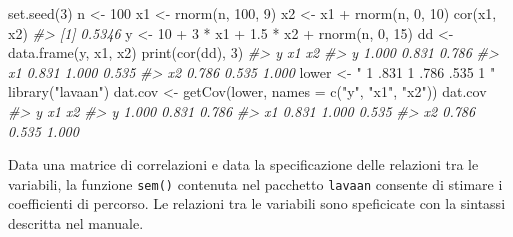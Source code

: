 \documentclass[
  11pt,
]{krantz}
\makeatletter
\newenvironment{Shaded}{\begin{snugshade}}{\end{snugshade}}
\newcommand{\AttributeTok}[1]{\textcolor[rgb]{0.61,0.61,0.61}{#1}}
\newcommand{\CommentTok}[1]{\textcolor[rgb]{0.37,0.37,0.37}{\textit{#1}}}
\newcommand{\DecValTok}[1]{\textcolor[rgb]{0.06,0.06,0.06}{#1}}
\newcommand{\FloatTok}[1]{\textcolor[rgb]{0.06,0.06,0.06}{#1}}
\newcommand{\FunctionTok}[1]{\textcolor[rgb]{0,0,0}{#1}}
\newcommand{\NormalTok}[1]{#1}
\newcommand{\OtherTok}[1]{\textcolor[rgb]{0.37,0.37,0.37}{#1}}
\newcommand{\SpecialCharTok}[1]{\textcolor[rgb]{0,0,0}{#1}}
\newcommand{\StringTok}[1]{\textcolor[rgb]{0.5,0.5,0.5}{#1}}
\newenvironment{kframe}{%
\medskip{}
\setlength{\fboxsep}{.8em}
 \def\at@end@of@kframe{}%
 \ifinner\ifhmode%
  \def\at@end@of@kframe{\end{minipage}}%
  \begin{minipage}{\columnwidth}%
 \fi\fi%
 \def\FrameCommand##1{\hskip\@totalleftmargin \hskip-\fboxsep
 \colorbox{shadecolor}{##1}\hskip-\fboxsep
     \hskip-\linewidth \hskip-\@totalleftmargin \hskip\columnwidth}%
 \MakeFramed {\advance\hsize-\width
   \@totalleftmargin\z@ \linewidth\hsize
   \@setminipage}}%
 {\par\unskip\endMakeFramed%
 \at@end@of@kframe}
\renewenvironment{Shaded}{\begin{kframe}}{\end{kframe}}
\theoremstyle{definition}
\theoremstyle{definition}
\theoremstyle{definition}
\theoremstyle{definition}
\theoremstyle{remark}
\makeatother
\begin{document}
\begin{Shaded}
\begin{Highlighting}[]
\FunctionTok{set.seed}\NormalTok{(}\DecValTok{3}\NormalTok{)}
\NormalTok{n }\OtherTok{\textless{}{-}} \DecValTok{100}
\NormalTok{x1 }\OtherTok{\textless{}{-}} \FunctionTok{rnorm}\NormalTok{(n, }\DecValTok{100}\NormalTok{, }\DecValTok{9}\NormalTok{)}
\NormalTok{x2 }\OtherTok{\textless{}{-}}\NormalTok{ x1 }\SpecialCharTok{+} \FunctionTok{rnorm}\NormalTok{(n, }\DecValTok{0}\NormalTok{, }\DecValTok{10}\NormalTok{)}
\FunctionTok{cor}\NormalTok{(x1, x2)}
\CommentTok{\#\textgreater{} [1] 0.5346}
\NormalTok{y }\OtherTok{\textless{}{-}} \DecValTok{10} \SpecialCharTok{+} \DecValTok{3} \SpecialCharTok{*}\NormalTok{ x1 }\SpecialCharTok{+} \FloatTok{1.5} \SpecialCharTok{*}\NormalTok{ x2 }\SpecialCharTok{+} \FunctionTok{rnorm}\NormalTok{(n, }\DecValTok{0}\NormalTok{, }\DecValTok{15}\NormalTok{)}
\NormalTok{dd }\OtherTok{\textless{}{-}} \FunctionTok{data.frame}\NormalTok{(y, x1, x2)}
\FunctionTok{print}\NormalTok{(}\FunctionTok{cor}\NormalTok{(dd), }\DecValTok{3}\NormalTok{)}
\CommentTok{\#\textgreater{}        y    x1    x2}
\CommentTok{\#\textgreater{} y  1.000 0.831 0.786}
\CommentTok{\#\textgreater{} x1 0.831 1.000 0.535}
\CommentTok{\#\textgreater{} x2 0.786 0.535 1.000}
\NormalTok{lower }\OtherTok{\textless{}{-}} \StringTok{"}
\StringTok{ 1}
\StringTok{ .831 1}
\StringTok{ .786 .535 1}
\StringTok{"}
\FunctionTok{library}\NormalTok{(}\StringTok{"lavaan"}\NormalTok{)}
\NormalTok{dat.cov }\OtherTok{\textless{}{-}} \FunctionTok{getCov}\NormalTok{(lower, }\AttributeTok{names =} \FunctionTok{c}\NormalTok{(}\StringTok{"y"}\NormalTok{, }\StringTok{"x1"}\NormalTok{, }\StringTok{"x2"}\NormalTok{))}
\NormalTok{dat.cov}
\CommentTok{\#\textgreater{}        y    x1    x2}
\CommentTok{\#\textgreater{} y  1.000 0.831 0.786}
\CommentTok{\#\textgreater{} x1 0.831 1.000 0.535}
\CommentTok{\#\textgreater{} x2 0.786 0.535 1.000}
\end{Highlighting}
\end{Shaded}

Data una matrice di correlazioni e data la specificazione delle relazioni tra le variabili, la funzione \texttt{sem()} contenuta nel pacchetto \texttt{lavaan} consente di stimare i coefficienti di percorso. Le relazioni tra le variabili sono speficicate con la sintassi descritta nel manuale.
\end{document}
